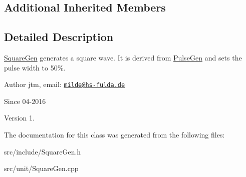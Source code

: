 \subsection*{Additional Inherited Members}


\subsection{Detailed Description}
\hyperlink{classunit_1_1SquareGen}{Square\-Gen} generates a square wave. It is derived from \hyperlink{classunit_1_1PulseGen}{Pulse\-Gen} and sets the pulse width to 50\%.

\begin{DoxyAuthor}{Author}
jtm, email\-:  \href{mailto:milde@hs-fulda.de}{\tt milde@hs-\/fulda.\-de} 
\end{DoxyAuthor}
\begin{DoxySince}{Since}
04-\/2016 
\end{DoxySince}
\begin{DoxyVersion}{Version}
1. 
\end{DoxyVersion}


The documentation for this class was generated from the following files\-:\begin{DoxyCompactItemize}
\item 
src/include/Square\-Gen.\-h\item 
src/unit/Square\-Gen.\-cpp\end{DoxyCompactItemize}
